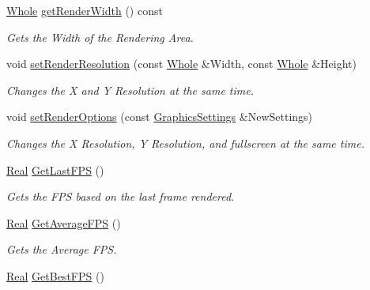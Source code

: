 \begin{DoxyCompactItemize}
\hyperlink{namespacephys_a460f6bc24c8dd347b05e0366ae34f34a}{Whole} \hyperlink{classphys_1_1GameWindow_a77e2ec6f64b7a7d1229aca32de57c872}{getRenderWidth} () const 
\begin{DoxyCompactList}\small\item\em Gets the Width of the Rendering Area. \item\end{DoxyCompactList}\item 
void \hyperlink{classphys_1_1GameWindow_a35ecbf1cb77037d33671e0f879f46a30}{setRenderResolution} (const \hyperlink{namespacephys_a460f6bc24c8dd347b05e0366ae34f34a}{Whole} \&Width, const \hyperlink{namespacephys_a460f6bc24c8dd347b05e0366ae34f34a}{Whole} \&Height)
\begin{DoxyCompactList}\small\item\em Changes the X and Y Resolution at the same time. \item\end{DoxyCompactList}\item 
void \hyperlink{classphys_1_1GameWindow_a430e91d4aeb6d1eb62ae84f498310593}{setRenderOptions} (const \hyperlink{structphys_1_1GraphicsSettings}{GraphicsSettings} \&NewSettings)
\begin{DoxyCompactList}\small\item\em Changes the X Resolution, Y Resolution, and fullscreen at the same time. \item\end{DoxyCompactList}\item 
\hyperlink{namespacephys_af7eb897198d265b8e868f45240230d5f}{Real} \hyperlink{classphys_1_1GameWindow_ab2b0d9150f394aa1b71f001768c6b011}{GetLastFPS} ()
\begin{DoxyCompactList}\small\item\em Gets the FPS based on the last frame rendered. \item\end{DoxyCompactList}\item 
\hyperlink{namespacephys_af7eb897198d265b8e868f45240230d5f}{Real} \hyperlink{classphys_1_1GameWindow_a3ec29af7b989701e3c14409f34497a15}{GetAverageFPS} ()
\begin{DoxyCompactList}\small\item\em Gets the Average FPS. \item\end{DoxyCompactList}\item 
\hyperlink{namespacephys_af7eb897198d265b8e868f45240230d5f}{Real} \hyperlink{classphys_1_1GameWindow_ab0fbfc031d5ace19cd79d8c3e6c8f4aa}{GetBestFPS} ()

\end{DoxyCompactItemize}
